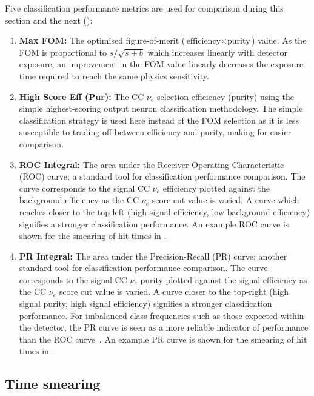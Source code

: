 Five classification performance metrics are used for comparison during this section and the next
():
\begin{enumerate}
    \item \textbf{Max FOM:} The optimised figure-of-merit ($\text{efficiency}\times\text{purity}$)
          value. As the FOM is proportional to $s/\sqrt{s+b}$ which increases linearly with
          detector exposure, an improvement in the FOM value linearly decreases the exposure time
          required to reach the same physics sensitivity.
    \item \textbf{High Score Eff (Pur):} The CC $\nu_{e}$ selection efficiency (purity) using the
          simple highest-scoring output neuron classification methodology. The simple
          classification strategy is used here instead of the FOM selection as it is less
          susceptible to trading off between efficiency and purity, making for easier comparison.
    \item \textbf{ROC Integral:} The area under the Receiver Operating Characteristic (ROC) curve;
          a standard tool for classification performance comparison. The curve corresponds to the
          signal CC $\nu_{e}$ efficiency plotted against the background efficiency as the CC
          $\nu_{e}$ score cut value is varied. A curve which reaches closer to the top-left (high
          signal efficiency, low background efficiency) signifies a stronger classification
          performance. An example ROC curve is shown for the smearing of hit times in
          .
    \item \textbf{PR Integral:} The area under the Precision-Recall (PR) curve; another standard
          tool for classification performance comparison. The curve corresponds to the signal CC
          $\nu_{e}$ purity plotted against the signal efficiency as the CC $\nu_{e}$ score cut
          value is varied. A curve closer to the top-right (high signal purity, high signal
          efficiency) signifies a stronger classification performance. For imbalanced class
          frequencies such as those expected within the \chipsfive detector, the PR curve is seen
          as a more reliable indicator of performance than the ROC curve~\cite{saito2015}. An
          example PR curve is shown for the smearing of hit times in
          .
\end{enumerate}

\subsection{Time smearing} %
\label{sec:results_robust_time} %

